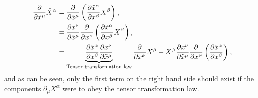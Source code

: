 \begin{align}
\frac{\partial}{\partial \tilde{x}^\mu} \tilde{X}^\alpha &= \frac{\partial}{\partial \tilde{x}^\mu}\left( \frac{\partial \tilde{x}^\alpha}{\partial x^\beta}{X}^\beta\right),\\
                                                         &= \frac{\partial x^\nu}{\partial \tilde{x}^\mu}\frac{\partial}{\partial {x}^\nu}\left( \frac{\partial \tilde{x}^\alpha}{\partial x^\beta}{X}^\beta\right),\\
                                                         &= \underbrace{\frac{\partial \tilde{x}^\alpha}{\partial x^\beta}\frac{\partial x^\nu}{\partial \tilde{x}^\mu}}_{\mathrm{Tensor}\,\,\rm{transformation}\,\,\rm{law}}\frac{\partial}{\partial {x}^\nu} {X}^\beta + {X}^\beta\frac{\partial x^\nu}{\partial \tilde{x}^\mu}\frac{\partial}{\partial {x}^\nu}\left( \frac{\partial \tilde{x}^\alpha}{\partial x^\beta}\right),
\end{align}
and as can be seen, only the first term on the right hand side should exist if the components $\partial_\mu X^\alpha$ were to obey the tensor transformation law. 

